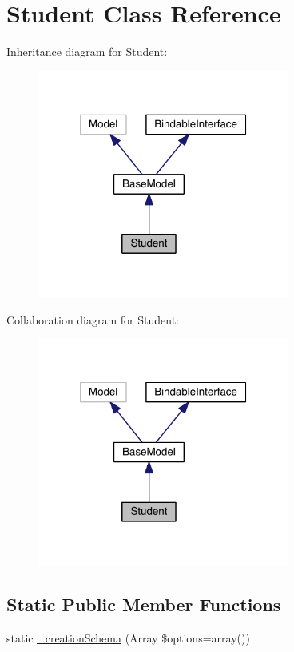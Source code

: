 \hypertarget{class_entity_1_1_student}{\section{Student Class Reference}
\label{class_entity_1_1_student}
}


Inheritance diagram for Student\-:
\nopagebreak
\begin{figure}[H]
\begin{center}
\leavevmode
\includegraphics[width=234pt]{class_entity_1_1_student__inherit__graph}
\end{center}
\end{figure}


Collaboration diagram for Student\-:
\nopagebreak
\begin{figure}[H]
\begin{center}
\leavevmode
\includegraphics[width=234pt]{class_entity_1_1_student__coll__graph}
\end{center}
\end{figure}
\subsection*{Static Public Member Functions}
\begin{DoxyCompactItemize}
\item 
static \hyperlink{class_entity_1_1_student_a0c47f287a3df4cf59d56b00b761a603c}{\-\_\-creation\-Schema} (Array \$options=array())
\end{DoxyCompactItemize}
